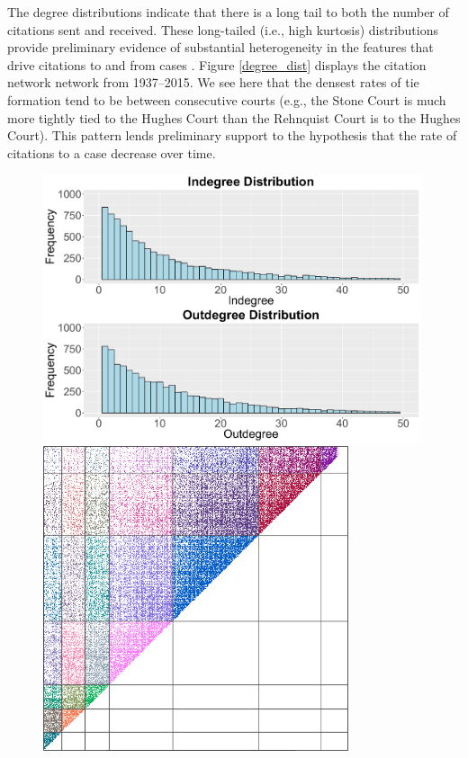 \documentclass{cup-pan}
\begin{document}
The degree distributions indicate that there is a long tail to both the number of citations sent and received. These long-tailed (i.e., high kurtosis) distributions provide preliminary evidence of substantial heterogeneity in the features that drive citations to and from cases \citep{strogatz2001exploring}. Figure \ref{degree_dist} displays the citation network network from 1937--2015. We see here that the densest rates of tie formation tend to be between consecutive courts (e.g., the Stone Court is much more tightly tied to the Hughes Court than the Rehnquist Court is to the Hughes Court). This pattern lends preliminary support to the hypothesis that the rate of citations to a case decrease over time.

\begin{figure}[bt]
\centering
\begin{minipage}{.37\linewidth}
\centering
\includegraphics[width = 0.99\textwidth]{degree_distribution.pdf}
\includegraphics[width = 0.8\textwidth]{data_mat.png}%

\end{minipage}
\end{figure}
\end{document}
